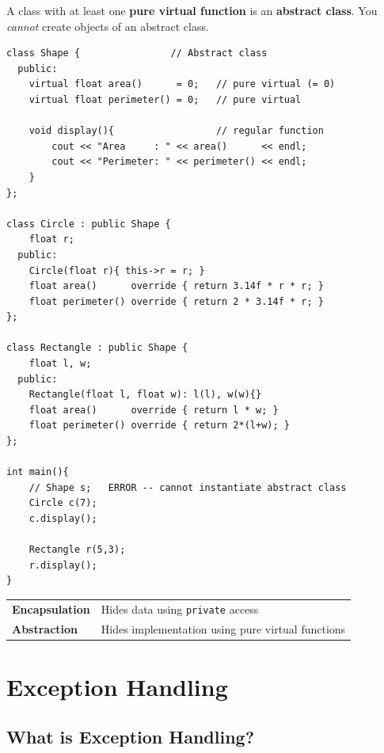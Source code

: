 \documentclass[12pt,a4paper]{report}
\begin{document}
A class with at least one \textbf{pure virtual function} is an \textbf{abstract class}.
You \textit{cannot} create objects of an abstract class.

\begin{lstlisting}[caption={Pure Virtual Function and Abstract Class}]
class Shape {                // Abstract class
  public:
    virtual float area()      = 0;   // pure virtual (= 0)
    virtual float perimeter() = 0;   // pure virtual

    void display(){                  // regular function
        cout << "Area     : " << area()      << endl;
        cout << "Perimeter: " << perimeter() << endl;
    }
};

class Circle : public Shape {
    float r;
  public:
    Circle(float r){ this->r = r; }
    float area()      override { return 3.14f * r * r; }
    float perimeter() override { return 2 * 3.14f * r; }
};

class Rectangle : public Shape {
    float l, w;
  public:
    Rectangle(float l, float w): l(l), w(w){}
    float area()      override { return l * w; }
    float perimeter() override { return 2*(l+w); }
};

int main(){
    // Shape s;   ERROR -- cannot instantiate abstract class
    Circle c(7);
    c.display();

    Rectangle r(5,3);
    r.display();
}
\end{lstlisting}

\begin{center}
\begin{tabular}{|l|l|}
\hline
\textbf{Encapsulation} & Hides data using \texttt{private} access \\
\textbf{Abstraction}   & Hides implementation using pure virtual functions \\
\hline
\end{tabular}
\end{center}

\chapter{Exception Handling}

\section{What is Exception Handling?}
\end{document}
